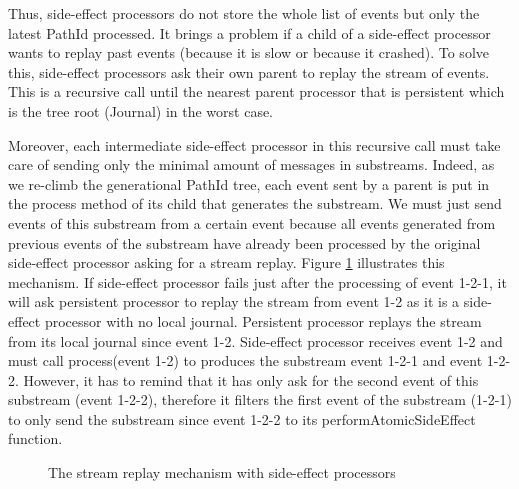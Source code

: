 Thus, side-effect processors do not store the whole list of events but only the latest PathId processed. It brings a problem if a child of a side-effect processor
wants to replay past events (because it is slow or because it crashed). To solve this, side-effect processors ask their own parent to replay the stream of events.
This is a recursive call until the nearest parent processor that is persistent which is the tree root (Journal) in the worst case. 

Moreover, each intermediate side-effect processor in this recursive call must take care of sending only the minimal amount of messages in substreams. Indeed,
as we re-climb the generational PathId tree, each event sent by a parent is put in the process method of its child that generates the substream. We must just send
events of this substream from a certain event because all events generated from previous events of the substream have already been processed by the original side-effect processor asking for a stream replay. 
Figure \ref{fig:sideeffectreclimb} illustrates this mechanism. If side-effect processor fails just after the processing of event 1-2-1, it will ask persistent processor to replay the stream from event 1-2 as it is a side-effect processor with no local journal. Persistent processor replays the stream from its local journal since event 1-2. Side-effect processor receives event 1-2 and must call process(event 1-2) to
produces the substream event 1-2-1 and event 1-2-2. However, it has to remind that it has only ask for the second event of this substream (event 1-2-2), therefore it filters the first event of the substream (1-2-1) to only send the substream since event 1-2-2 to its performAtomicSideEffect function. 
\\

\begin{figure}[h]
  \begin{center} 
    \caption{The stream replay mechanism with side-effect processors}
    \label{fig:sideeffectreclimb}
  \end{center}
\end{figure}

